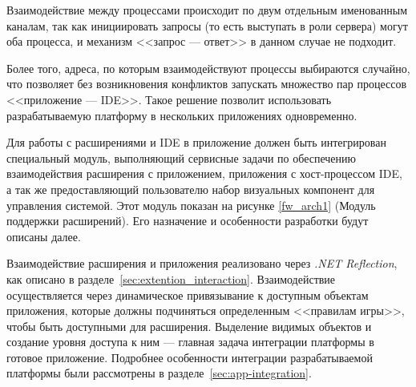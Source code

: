 Взаимодействие между процессами происходит по двум отдельным именованным каналам, так как инициировать запросы (то есть выступать в роли сервера) могут оба процесса, и механизм <<запрос --- ответ>> в данном случае не подходит.

Более того, адреса, по которым взаимодействуют процессы выбираются случайно, что позволяет без возникновения конфликтов запускать множество пар процессов <<приложение --- IDE>>. Такое решение позволит использовать разрабатываемую платформу в нескольких приложениях одновременно.

Для работы с расширениями и IDE в приложение должен быть интегрирован специальный модуль, выполняющий сервисные задачи по обеспечению взаимодействия расширения с приложением, приложения с хост-процессом IDE, а так же предоставляющий пользователю набор визуальных компонент для управления системой. Этот модуль показан на рисунке \ref{fw_arch1} (Модуль поддержки расширений). Его назначение и особенности разработки будут описаны далее.

Взаимодействие расширения и приложения реализовано через {\it .NET Reflection}, как описано в разделе~\ref{sec:extention_interaction}. Взаимодействие осуществляется через динамическое привязывание к доступным объектам приложения, которые должны подчиняться определенным <<правилам игры>>, чтобы быть доступными для расширения. Выделение видимых объектов и создание уровня доступа к ним --- главная задача интеграции платформы в готовое приложение. Подробнее особенности интеграции разрабатываемой платформы были рассмотрены в разделе~\ref{sec:app-integration}.